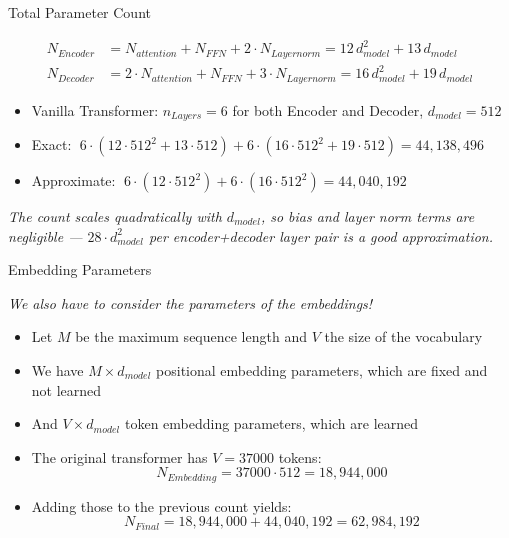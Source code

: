 \begin{frame}{Total Parameter Count}

{\small
\begin{align*}
N_{Encoder} &= N_{attention} + N_{FFN} + 2\cdot N_{Layernorm} = 12\, d_{model}^2 + 13\, d_{model} \\
N_{Decoder} &= 2\cdot N_{attention} + N_{FFN} + 3\cdot N_{Layernorm} = 16\, d_{model}^2 + 19\, d_{model}
\end{align*}}

\begin{itemize}
    \item Vanilla Transformer: $n_{Layers} = 6$ for both Encoder and Decoder, $d_{model} = 512$
    \item Exact: $\;6\cdot(12\cdot 512^2 + 13\cdot 512) + 6\cdot(16\cdot 512^2 + 19\cdot 512) = 44,138,496$
    \item Approximate: $\;6\cdot(12\cdot 512^2) + 6\cdot(16\cdot 512^2) = 44,040,192$
\end{itemize}

\textit{The count scales quadratically with $d_{model}$, so bias and layer norm terms are negligible --- $28\cdot d_{model}^2$ per encoder+decoder layer pair is a good approximation.}

\end{frame}

\begin{frame}{Embedding Parameters}

\textit{We also have to consider the parameters of the embeddings!}

\begin{itemize}
    \item Let $M$ be the maximum sequence length and $V$ the size of the vocabulary
    \item We have $M \times d_{model}$ positional embedding parameters, which are fixed and not learned
    \item And $V \times d_{model}$ token embedding parameters, which are learned
    \item The original transformer has $V = 37000$ tokens:
			$$N_{Embedding} = 37000 \cdot 512 = 18,944,000$$
		\item Adding those to the previous count yields:
			$$N_{Final} = 18,944,000 + 44,040,192 = 62,984,192$$

\end{itemize}

\end{frame}



